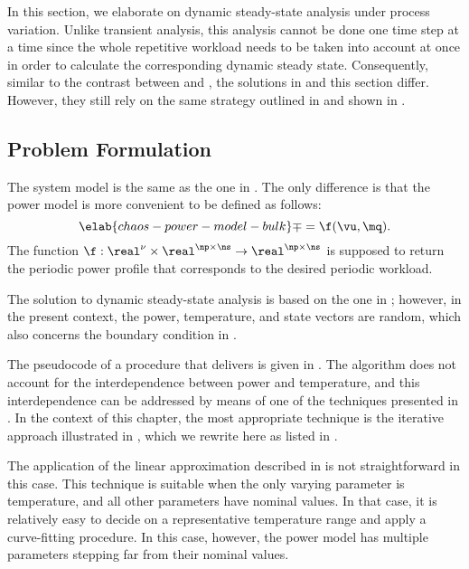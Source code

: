 In this section, we elaborate on dynamic steady-state analysis under process
variation. Unlike transient analysis, this analysis cannot be done one time step
at a time since the whole repetitive workload needs to be taken into account at
once in order to calculate the corresponding dynamic steady state. Consequently,
similar to the contrast between  and
, the solutions in
 and this section differ. However, they still
rely on the same strategy outlined in  and
shown in .

\subsection{Problem Formulation}

The system model is the same as the one in . The
only difference is that the power model is more convenient to be defined as
follows:
\begin{equation} \elab{chaos-power-model-bulk}
  \mp = \f(\vu, \mq).
\end{equation}
The function $\f: \real^\nu \times \real^{\np \times \ns} \to \real^{\np \times
\ns}$ is supposed to return the periodic power profile that corresponds to the
desired periodic workload.

The solution to dynamic steady-state analysis is based on the one in
; however, in the present context, the
power, temperature, and state vectors are random, which also concerns the
boundary condition in .

The pseudocode of a procedure that delivers \mq is given in
. The algorithm does not account for the
interdependence between power and temperature, and this interdependence can be
addressed by means of one of the techniques presented in
. In the context of this chapter, the most
appropriate technique is the iterative approach illustrated in
, which we rewrite here as listed in
.

\begin{remark}
The application of the linear approximation described in
 is not straightforward in this case. This
technique is suitable when the only varying parameter is temperature, and all
other parameters have nominal values. In that case, it is relatively easy to
decide on a representative temperature range and apply a curve-fitting
procedure. In this case, however, the power model has multiple parameters
stepping far from their nominal values.
\end{remark}


